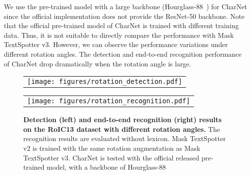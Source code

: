 \documentclass[runningheads]{llncs}
\begin{document}
We use the pre-trained model with a large backbone (Hourglass-88~\cite{hourglass}) for CharNet since the official implementation does not provide the ResNet-50 backbone. Note that the official pre-trained model of CharNet is trained with different training data. Thus, it is not suitable to directly compare the performance with Mask TextSpotter v3. However, we can observe the performance variations under different rotation angles. The detection and end-to-end recognition performance of CharNet drop dramatically when the rotation angle is large.

\begin{figure}[ht]
    \centering
    \begin{tabular}{l}
    \texttt{[image: figures/rotation\_detection.pdf]}
    \label{fig:rotation-detection}
    \end{tabular}{}
    \begin{tabular}{r}
    \texttt{[image: figures/rotation\_recognition.pdf]}
    \label{fig:rotation-recognition}
    \end{tabular}{}
    \caption{\textbf{Detection (left) and end-to-end recognition (right) results on the RoIC13 dataset with different rotation angles.} The recognition results are evaluated without lexicon. Mask TextSpotter v2 is trained with the same rotation augmentation as Mask TextSpotter v3. CharNet is tested with the official released pre-trained model, with a backbone of Hourglass-88~\cite{hourglass}}
\end{figure}
\end{document}
